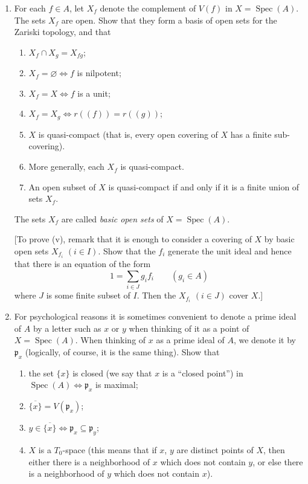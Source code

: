 \begin{enumerate}
\item For each $f\in A$, let $X_f$ denote the complement of $V(f)$ in $X=\operatorname{Spec}(A)$. The sets $X_f$ are open. Show that they form a basis of open sets for the Zariski topology, and that
\begin{enumerate}
\renewcommand{\labelenumii}{\roman{enumii})}
\item $X_f\cap X_g=X_{fg}$;
\item $X_f=\varnothing\Longleftrightarrow f$ is nilpotent;
\item $X_f=X\Longleftrightarrow f$ is a unit;
\item $X_f=X_g\Longleftrightarrow r((f))=r((g))$;
\item $X$ is quasi-compact (that is, every open covering of $X$ has a finite sub-covering).
\item More generally, each $X_f$ is quasi-compact.
\item An open subset of $X$ is quasi-compact if and only if it is a finite union of sets $X_f$.
\end{enumerate}
The sets $X_f$ are called \textit{basic open sets} of $X=\operatorname{Spec}(A)$.

[To prove (v), remark that it is enough to consider a covering of $X$ by basic open sets $X_{f_i}$ $(i\in I)$. Show that the $f_i$ generate the unit ideal and hence that there is an equation of the form
\[
 1=\sum_{i\in J}g_if_i\qquad(g_i\in A)
\]
where $J$ is some finite subset of $I$. Then the $X_{f_i}$ $(i\in J)$ cover $X$.]

\item For psychological reasons it is sometimes convenient to denote a prime ideal of $A$ by a letter such as $x$ or $y$ when thinking of it as a point of $X=\operatorname{Spec}(A)$. When thinking of $x$ as a prime ideal of $A$, we denote it by $\mathfrak p_x$ (logically, of course, it is the same thing). Show that
\begin{enumerate}
\renewcommand{\labelenumii}{\roman{enumii})}
\item the set $\{x\}$ is closed (we say that $x$ is a ``closed point'') in $\operatorname{Spec}(A)\Longleftrightarrow\mathfrak p_x$ is maximal;
\item $\overline{\{x\}}=V(\mathfrak p_x)$;
\item $y\in\overline{\{x\}}\Longleftrightarrow\mathfrak p_x\subseteq\mathfrak p_y$;
\item $X$ is a $T_0$-space (this means that if $x$, $y$ are distinct points of $X$, then either there is a neighborhood of $x$ which does not contain $y$, or else there is a neighborhood of $y$ which does not contain $x$).
\end{enumerate}


\end{enumerate}
